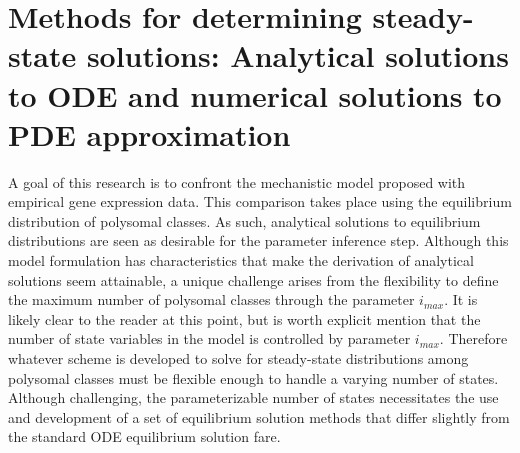 \documentclass[review]{elsarticle}
\begin{document}


\section{Methods for determining steady-state solutions: Analytical solutions to ODE and numerical solutions to PDE approximation}
A goal of this research is to confront the mechanistic model proposed with empirical gene expression data.  This comparison takes place using the equilibrium distribution of polysomal classes.  As such, analytical solutions to equilibrium distributions are seen as desirable for the parameter inference step.  Although this model formulation has characteristics that make the derivation of analytical solutions seem attainable, a unique challenge arises from the flexibility to define the maximum number of polysomal classes through the parameter $i_{max}$.  It is likely clear to the reader at this point, but is worth explicit mention that the number of state variables in the model is controlled by parameter $i_{max}$.  Therefore whatever scheme is developed to solve for steady-state distributions among polysomal classes must be flexible enough to handle a varying number of states.  Although challenging, the parameterizable number of states necessitates the use and development of a set of equilibrium solution methods that differ slightly from the standard ODE equilibrium solution fare.

\end{document}
